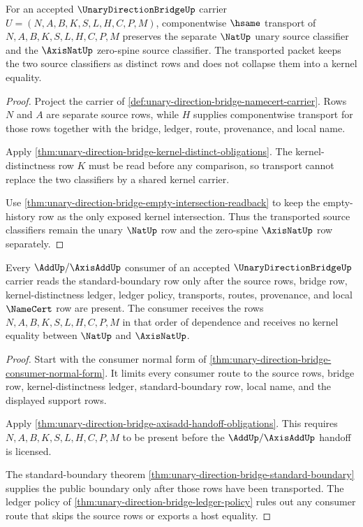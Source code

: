 \begin{theorem}
\label{thm:unary-direction-bridge-source-classifier-transport}
For an accepted $\UnaryDirectionBridgeUp$ carrier $U=(N,A,B,K,S,L,H,C,P,M)$, componentwise $\hsame$ transport of $N,A,B,K,S,L,H,C,P,M$ preserves the separate $\NatUp$ unary source classifier and the $\AxisNatUp$ zero-spine source classifier. The transported packet keeps the two source classifiers as distinct rows and does not collapse them into a kernel equality.
\end{theorem}
\begin{proof}
Project the carrier of \autoref{def:unary-direction-bridge-namecert-carrier}. Rows $N$ and $A$ are separate source rows, while $H$ supplies componentwise transport for those rows together with the bridge, ledger, route, provenance, and local name.

Apply \autoref{thm:unary-direction-bridge-kernel-distinct-obligations}. The kernel-distinctness row $K$ must be read before any comparison, so transport cannot replace the two classifiers by a shared kernel carrier.

Use \autoref{thm:unary-direction-bridge-empty-intersection-readback} to keep the empty-history row as the only exposed kernel intersection. Thus the transported source classifiers remain the unary $\NatUp$ row and the zero-spine $\AxisNatUp$ row separately.
\end{proof}

\begin{theorem}
\label{thm:unary-direction-bridge-additive-consumer-exactness}
Every $\AddUp/\AxisAddUp$ consumer of an accepted $\UnaryDirectionBridgeUp$ carrier reads the standard-boundary row only after the source rows, bridge row, kernel-distinctness ledger, ledger policy, transports, routes, provenance, and local $\NameCert$ row are present. The consumer receives the rows $N,A,B,K,S,L,H,C,P,M$ in that order of dependence and receives no kernel equality between $\NatUp$ and $\AxisNatUp$.
\end{theorem}
\begin{proof}
Start with the consumer normal form of \autoref{thm:unary-direction-bridge-consumer-normal-form}. It limits every consumer route to the source rows, bridge row, kernel-distinctness ledger, standard-boundary row, local name, and the displayed support rows.

Apply \autoref{thm:unary-direction-bridge-axisadd-handoff-obligations}. This requires $N,A,B,K,S,L,H,C,P,M$ to be present before the $\AddUp/\AxisAddUp$ handoff is licensed.

The standard-boundary theorem \autoref{thm:unary-direction-bridge-standard-boundary} supplies the public boundary only after those rows have been transported. The ledger policy of \autoref{thm:unary-direction-bridge-ledger-policy} rules out any consumer route that skips the source rows or exports a host equality.
\end{proof}


